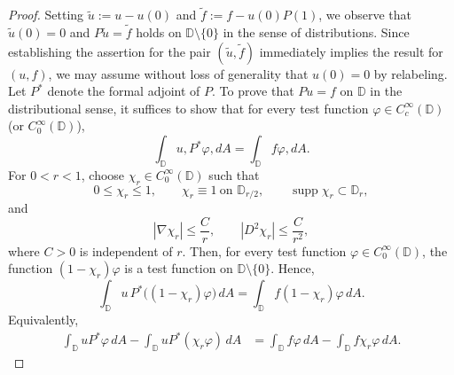 \documentclass[12pt,twoside]{amsart}
\newcommand{\D}{\ensuremath{\mathbb{D}}}
\numberwithin{equation}{section}
\numberwithin{definition}{section} %
\begin{document}
\begin{proof}
Setting $\widetilde{u} := u - u(0)$ and $\widetilde{f} := f - u(0)P(1)$, we observe that $\widetilde{u}(0) = 0$ and $P\widetilde{u} = \widetilde{f}$ holds on $\mathbb{D} \setminus \{0\}$ in the sense of distributions. Since establishing the assertion for the pair $(\widetilde{u}, \widetilde{f})$ immediately implies the result for $(u, f)$, we may assume without loss of generality that $u(0) = 0$ by relabeling. Let $P^*$ denote the formal adjoint of $P$. To prove that $Pu = f$ on $\mathbb{D}$ in the distributional sense, it suffices to show that for every test function $\varphi \in C_c^\infty(\mathbb{D})$ (or $C_0^\infty(\mathbb{D})$),
\begin{equation}\label{eq:secondwant}
\int_{\mathbb{D}} u , P^*\varphi , dA = \int_{\mathbb{D}} f \varphi , dA.
\end{equation}
For $0<r<1$, choose $\chi_r\in C_0^\infty(\mathbb D)$ such that
\[
0\le \chi_r\le1,\qquad
\chi_r\equiv1\ \text{on }\mathbb D_{r/2},\qquad
\operatorname{supp}\chi_r\subset\mathbb D_r,
\]
and
\[
|\nabla\chi_r|\le\frac{C}{r},\qquad
|D^2\chi_r|\le\frac{C}{r^2},
\]
where $C>0$ is independent of $r$. Then, for every test function $\varphi\in C_0^\infty(\mathbb D)$,
the function $(1-\chi _r) \varphi$ is a test function on $\D \setminus \{ 0\}$. Hence,
\[
\int_{\mathbb D} u\,P^*\bigl((1-\chi_r)\varphi\bigr)\,dA
= \int_{\mathbb D} f(1-\chi_r)\varphi\,dA.
\]
Equivalently,
\begin{equation}\label{eq:seconddist}
\begin{aligned}
\int_{\mathbb D}uP^*\varphi\,dA
-\int_{\mathbb D}uP^*(\chi_r\varphi)\,dA
&=
\int_{\mathbb D}f\varphi\,dA
-\int_{\mathbb D}f\chi_r\varphi\,dA.
\end{aligned}
\end{equation}

\end{proof}
\end{document}
